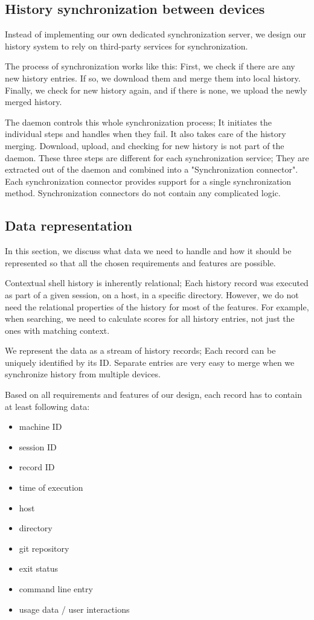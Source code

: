 \subsection{History synchronization between devices}

Instead of implementing our own dedicated synchronization server, we design our history system to rely on third-party services for synchronization. 

The process of synchronization works like this: First, we check if there are any new history entries. If so, we download them and merge them into local history. Finally, we check for new history again, and if there is none, we upload the newly merged history. 

The daemon controls this whole synchronization process; It initiates the individual steps and handles when they fail. It also takes care of the history merging. Download, upload, and checking for new history is not part of the daemon. These three steps are different for each synchronization service; They are extracted out of the daemon and combined into a "Synchronization connector". Each synchronization connector provides support for a single synchronization method. Synchronization connectors do not contain any complicated logic. 


\subsection{Data representation}

In this section, we discuss what data we need to handle and how it should be represented so that all the chosen requirements and features are possible.


Contextual shell history is inherently relational; Each history record was executed as part of a given session, on a host, in a specific directory. However, we do not need the relational properties of the history for most of the features. For example, when searching, we need to calculate scores for all history entries, not just the ones with matching context. 

We represent the data as a stream of history records; Each record can be uniquely identified by its ID. Separate entries are very easy to merge when we synchronize history from multiple devices.

Based on all requirements and features of our design, each record has to contain at least following data:
\begin{itemize}
\item machine ID
\item session ID
\item record ID
\item time of execution
\item host
\item directory
\item git repository
\item exit status
\item command line entry
\item usage data / user interactions
\end{itemize}



